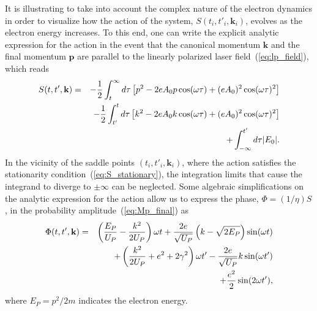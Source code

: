 It is illustrating to take into account the complex nature of the
electron dynamics in order to visualize how the action of the system,
$S(t_{i},t'_{i},\mathbf{k}_{i})$, evolves as the electron energy
increases. To this end, one can write the explicit analytic expression
for the action in the event that the canonical momentum $\mathbf{k}$
and the final momentum $\mathbf{p}$ are parallel to the linearly
polarized laser field~(\ref{eq:lp_field}), which reads
%
\begin{eqnarray}
  \label{eq:action_analytic}
S(t, t', \bf{k}) & = &
-\frac{1}{2} \int_{t}^{\infty} d\tau\left[ p^{2}
- 2eA_{0}p\cos(\omega\tau) + (eA_{0})^{2}\cos(\omega\tau)^{2} \right]\nonumber\\
&& -\frac{1}{2} \int_{t'}^{t} d\tau\left[k^{2}
- 2eA_{0}k\cos(\omega\tau) + (eA_{0})^{2}\cos(\omega\tau)^{2} \right]\nonumber\\
&& + \int_{-\infty}^{t'} d\tau|E_{0}|.
\end{eqnarray}
%
In the vicinity of the saddle points $(t_{i},t'_{i},\mathbf{k}_{i})$,
where the action satisfies the stationarity
condition~(\ref{eq:S_stationary}), the integration limits that cause
the integrand to diverge to $\pm\infty$ can be neglected. Some
algebraic simplifications on the analytic expression for the action
allow us to express the phase, $\Phi = (1/\eta)S$, in the probability
amplitude~(\ref{eq:Mp_final}) as
%
\begin{eqnarray}
  \label{eq:phase_final}
\Phi(t, t', \bf{k}) & = &
\left(\frac{E_{P}}{U_{P}} - \frac{k^{2}}{2U_{P}}\right) \omega t
+ \frac{2e}{\sqrt{U_{P}}} \left( k - \sqrt{2E_{P}}\right) \sin(\omega t) \nonumber\\
&&
+ \left( \frac{k^{2}}{2U_{P}} + e^{2}+2\gamma^{2} \right)\omega t'
- \frac{2e}{\sqrt{U_{P}}} k\sin(\omega t') \nonumber\\
&&
+ \frac{e^2}{2}\sin(2\omega t'),
\end{eqnarray}
%
where $E_{P} = p^{2}/2m$ indicates the electron energy.



